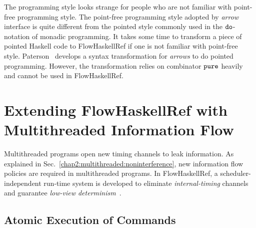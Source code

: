 \documentclass[a4paper]{report}
\newcommand{\co}[1]{$\cod{#1}$}
\begin{document}
The programming style looks strange for people who are not familiar with point-free programming style.
The point-free programming style adopted by {\em arrow} interface is quite different from the pointed style commonly
used in the \co{do}-notation of monadic programming. It takes some time to transform a piece of pointed Haskell 
code to FlowHaskellRef
if one is not familiar with point-free style.
Paterson~\cite{Paterson:ICFP01} develops a syntax transformation 
for {\em arrows} to do pointed programming. However, the transformation relies on combinator \co{pure} heavily and
cannot be used in FlowHaskellRef. 

\chapter{Extending FlowHaskellRef with Multithreaded Information Flow}
Multithreaded programs open new timing channels to leak information. As explained in 
Sec.~\ref{chap2:multithreaded:noninterference}, new information flow policies are
required in multithreaded programs. In FlowHaskellRef,
a scheduler-independent run-time system is developed to
eliminate {\em internal-timing} channels and guarantee {\em low-view determinism}~\cite{Roscoe:SSP95}. 

\section{Atomic Execution of Commands}
\label{chap7:atomicexecution}
\end{document}
